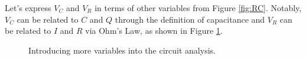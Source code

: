 \documentclass{article}
\begin{document}
Let's express $V_C$ and $V_R$ in terms of other variables from Figure \ref{fig:RC}. Notably, $V_C$ can be related to $C$ and $Q$ through the definition of capacitance and $V_R$ can be related to $I$ and $R$ via Ohm's Law, as shown in Figure \ref{fig:tree}.

\begin{figure}[h!]
    \centering
    \caption{Introducing more variables into the circuit analysis.}
    \label{fig:tree}
\end{figure}
\end{document}
